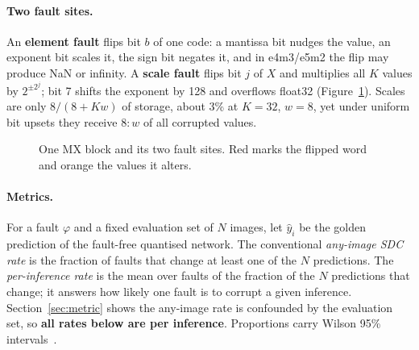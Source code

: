 \documentclass[10pt,a4paper]{article}
\begin{document}
\paragraph{Two fault sites.} An \textbf{element fault} flips bit $b$ of one code: a mantissa
bit nudges the value, an exponent bit scales it, the sign bit negates it, and in e4m3/e5m2 the
flip may produce NaN or infinity. A \textbf{scale fault} flips bit $j$ of $X$ and multiplies all
$K$ values by $2^{\pm2^{j}}$; bit 7 shifts the exponent by 128 and overflows float32
(Figure~\ref{fig:block}). Scales are only $8/(8+Kw)$ of storage, about 3\% at $K=32$, $w=8$, yet
under uniform bit upsets they receive $8:w$ of all corrupted values.

\begin{figure}[htbp]
\centering
{}
\caption{One MX block and its two fault sites. Red marks the flipped word and orange the values
it alters.}
\label{fig:block}
\end{figure}

\paragraph{Metrics.} For a fault $\varphi$ and a fixed evaluation set of $N$ images, let
$\hat y_i$ be the golden prediction of the fault-free quantised network. The conventional
\emph{any-image SDC rate} is the fraction of faults that change at least one of the $N$
predictions. The \emph{per-inference rate} is the mean over faults of the fraction of the $N$
predictions that change; it answers how likely one fault is to corrupt a given inference.
Section~\ref{sec:metric} shows the any-image rate is confounded by the evaluation set, so
\textbf{all rates below are per inference}. Proportions carry Wilson 95\%
intervals~\cite{wilson1927}.
\end{document}
